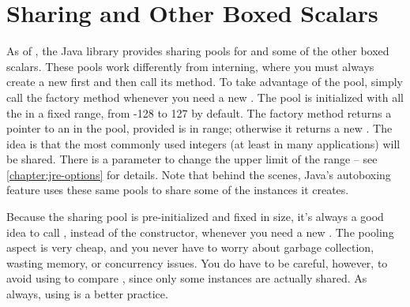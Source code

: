 \section{Sharing  and Other Boxed Scalars}

As of \javafive, the Java library provides sharing pools for
 and some of the other boxed scalars. These pools
work differently from  interning, where you must always create a
new  first and then call its  method. To take
advantage of the  pool, simply call the factory method
 whenever you need a new .
The  pool is initialized with all the  in a fixed
range, from -128 to 127 by default. The factory method returns a
pointer to an  in the pool, provided  is in
range; otherwise it returns a new . 
The idea is  that the most commonly
used integers (at least in many applications) will be shared. There is a
parameter to change the upper limit of the range -- see
\autoref{chapter:jre-options} for details. Note that
behind the scenes, Java's autoboxing feature uses these same pools
to share some of the instances it creates.



Because the  sharing pool is pre-initialized and fixed in size,
it's always a good idea to call , instead of
the constructor, whenever you need a new . The pooling aspect is
very cheap, and you never have to worry about garbage collection, wasting memory, or concurrency issues.
You do have to be careful, however, to avoid using \code{==} to compare
, since only some instances are actually shared. 
As always, using  is a better practice.

